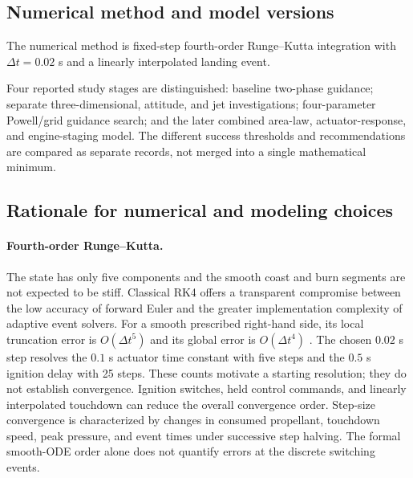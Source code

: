 \documentclass[11pt,a4paper]{article}
\begin{document}
\subsection{Numerical method and model versions}
The numerical method is fixed-step fourth-order Runge--Kutta integration with $\Delta t=0.02$ s and a linearly interpolated landing event.

Four reported study stages are distinguished: baseline two-phase guidance; separate three-dimensional, attitude, and jet investigations; four-parameter Powell/grid guidance search; and the later combined area-law, actuator-response, and engine-staging model. The different success thresholds and recommendations are compared as separate records, not merged into a single mathematical minimum.


\subsection{Rationale for numerical and modeling choices}
\label{sec:rationale}
\paragraph{Fourth-order Runge--Kutta.}
The state has only five components and the smooth coast and burn segments are not expected to be stiff. Classical RK4 offers a transparent compromise between the low accuracy of forward Euler and the greater implementation complexity of adaptive event solvers. For a smooth prescribed right-hand side, its local truncation error is $O(\Delta t^5)$ and its global error is $O(\Delta t^4)$ \cite{hairer}. The chosen $0.02$ s step resolves the $0.1$ s actuator time constant with five steps and the $0.5$ s ignition delay with 25 steps. These counts motivate a starting resolution; they do not establish convergence. Ignition switches, held control commands, and linearly interpolated touchdown can reduce the overall convergence order. Step-size convergence is characterized by changes in consumed propellant, touchdown speed, peak pressure, and event times under successive step halving. The formal smooth-ODE order alone does not quantify errors at the discrete switching events.
\end{document}
